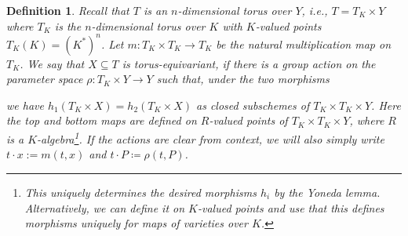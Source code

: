 \documentclass[12pt,reqno,a4paper]{amsart}
\theoremstyle{theoremstyle}
\theoremstyle{examplestyle}
\newtheorem{definition}[theorem]{Definition}
\theoremstyle{algorithmstyle}
\begin{document}
\begin{definition}

  Recall that $T$ is an $n$-dimensional torus over $Y$, i.e., $T=T_K\times Y$ where $T_K$ is the $n$-dimensional torus over $K$ with $K$-valued points $T_{K}(K)=(K^\ast)^n$.
  Let
  \begin{math}
    m\colon T_K\times T_K\to T_K
  \end{math}
  be the natural multiplication map on $T_K$.
  We say that $X\subseteq T$ is \emph{torus-equivariant}, if there is a group action on the parameter space $\rho\colon T_K\times Y\to Y$ such that, under the two morphisms
  \begin{center}
  \end{center}
  we have $h_{1}(T_K\times X)=h_{2}(T_K\times X)$ as closed subschemes of $T_K\times T_K\times Y$.   Here the top and bottom maps are defined on $R$-valued points of $T_{K}\times T_{K}\times Y$, where $R$ is a $K$-algebra\footnote{This uniquely determines the desired morphisms $h_{i}$ by the Yoneda lemma. Alternatively, we can define it on $K$-valued points and use that this defines morphisms uniquely for maps of varieties over $K$. }.   If the actions are clear from context, we will also simply write $t\cdot x:=m(t,x)$ and $t\cdot P\coloneqq\rho(t,P)$.
\end{definition}
\end{document}
